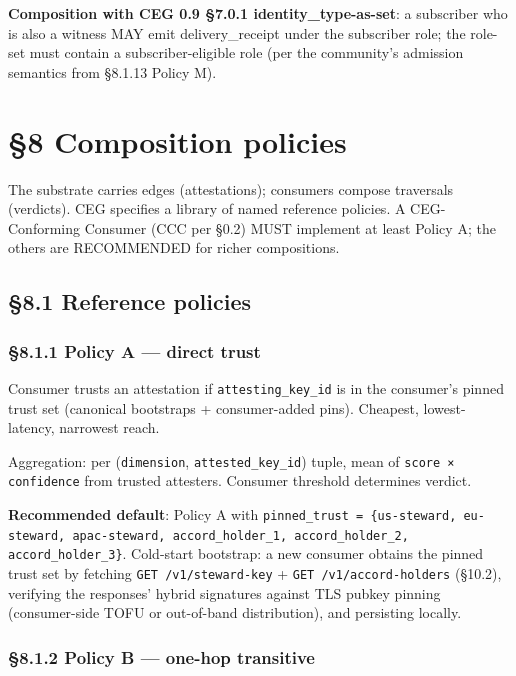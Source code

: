 \documentclass[10pt]{article}
\begin{document}
\textbf{Composition with CEG 0.9 §7.0.1 identity\_type-as-set}: a subscriber who is also a witness MAY emit delivery\_receipt under the subscriber role; the role-set must contain a subscriber-eligible role (per the community's admission semantics from §8.1.13 Policy M).




\clearpage


\section*{§8 Composition policies}


The substrate carries edges (attestations); consumers compose traversals (verdicts). CEG specifies a library of named reference policies. A CEG-Conforming Consumer (CCC per §0.2) MUST implement at least Policy A; the others are RECOMMENDED for richer compositions.


\subsection*{§8.1 Reference policies}


\subsubsection*{§8.1.1 Policy A — direct trust}


Consumer trusts an attestation if \texttt{attesting\_key\_id} is in the consumer's pinned trust set (canonical bootstraps + consumer-added pins). Cheapest, lowest-latency, narrowest reach.


Aggregation: per (\texttt{dimension}, \texttt{attested\_key\_id}) tuple, mean of \texttt{score × confidence} from trusted attesters. Consumer threshold determines verdict.


\textbf{Recommended default}: Policy A with \texttt{pinned\_trust = \{us-steward, eu-steward, apac-steward, accord\_holder\_1, accord\_holder\_2, accord\_holder\_3\}}. Cold-start bootstrap: a new consumer obtains the pinned trust set by fetching \texttt{GET /v1/steward-key} + \texttt{GET /v1/accord-holders} (§10.2), verifying the responses' hybrid signatures against TLS pubkey pinning (consumer-side TOFU or out-of-band distribution), and persisting locally.


\subsubsection*{§8.1.2 Policy B — one-hop transitive}
\end{document}

